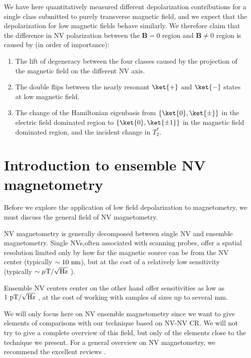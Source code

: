 \documentclass[a4paper,11pt]{report}
\begin{document}
\begin{refsection}
We have here quantitatively measured different depolarization contributions for a single class submitted to purely transverse magnetic field, and we expect that the depolarization for low magnetic fields behave similarly. We therefore claim that the difference in NV polarization between the $\mathbf{B}=0$ region and $\mathbf{B} \neq 0$ region is caused by (in order of importance):
\begin{enumerate}
\item The lift of degeneracy between the four classes caused by the projection of the magnetic field on the different NV axis.
\item The double flips between the nearly resonant $\ket{+}$ and $\ket{-}$ states at low magnetic field.
\item The change of the Hamiltonian eigenbasis from $\{\ket{0}, \ket{\pm} \}$ in the electric field dominated region to $\{\ket{0}, \ket{\pm 1} \}$ in the magnetic field dominated region, and the incident change in $T_2^*$.
\end{enumerate}

\section{Introduction to ensemble NV magnetometry}

Before we explore the application of low field depolarization to magnetometry, we must discuss the general field of NV magnetometry. 

NV magnetometry is generally decomposed between single NV and ensemble magnetometry. Single NVs,often associated with scanning probes, offer a spatial resolution limited only by how far the magnetic source can be from the NV center (typically $\sim 10\ \rm nm$), but at the cost of a relatively low sensitivity (typically $\sim \mu \rm{T} / \sqrt{\rm Hz}$ \citep{pelliccione2016scanned}).

Ensemble NV centers center on the other hand offer sensitivities as low as $1\ \rm pT / \sqrt{\rm Hz}$ \citep{wolf2015subpicotesla}, at the cost of working with samples of sizes up to several mm.

We will only focus here on NV ensemble magnetometry since we want to give elements of comparisons with our technique based on NV-NV CR. We will not try to give a complete overview of this field, but only of the elements close to the technique we present. For a general overview on NV magnetometry, we recommend the excellent reviews  \citep{rondin2014magnetometry, degen2017quantum, barry2020sensitivity}.


\end{refsection}
\end{document}
